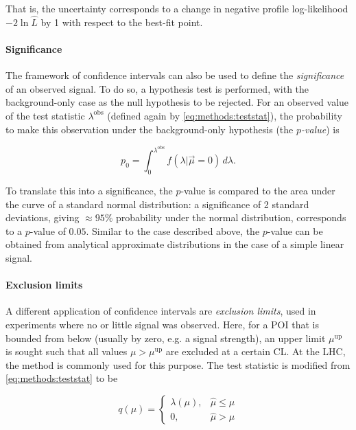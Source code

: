 That is, the uncertainty corresponds to a change in negative profile log-likelihood $-2 \ln \hat{L}$ by 1 with respect to the best-fit point.

\paragraph{Significance}

The framework of confidence intervals can also be used to define the \textit{significance} of an observed signal. To do so, a hypothesis test is performed, with the background-only case as the null hypothesis to be rejected. For an observed value of the test statistic $\lambda^{\mathrm{obs}}$ (defined again by \cref{eq:methods:teststat}), the probability to make this observation under the background-only hypothesis (the \textit{$p$-value}) is

\begin{equation}
\label{eq:methods:pvalue}
    p_0 = \int_0^{\lambda^{\mathrm{obs}}} f(\lambda | \vec{\mu} = 0) \, d\lambda.
\end{equation}

To translate this into a significance, the $p$-value is compared to the area under the curve of a standard normal distribution: a significance of 2 standard deviations, giving $\approx 95\%$ probability under the normal distribution, corresponds to a $p$-value of $0.05$. Similar to the case described above, the $p$-value can be obtained from analytical approximate distributions in the case of a simple linear signal.

\paragraph{Exclusion limits}

A different application of confidence intervals are \textit{exclusion limits}, used in experiments where no or little signal was observed. Here, for a POI that is bounded from below (usually by zero, e.g. a signal strength), an upper limit $\mu^{\mathrm{up}}$ is sought such that all values $\mu > \mu^{\mathrm{up}}$ are excluded at a certain CL. At the LHC, the \CLs method is commonly used for this purpose. The test statistic is modified from \cref{eq:methods:teststat} to be 

\begin{equation}
    q(\mu) = \begin{cases} 
        \lambda(\mu), & \hat{\mu} \leq \mu \\
        0, & \hat{\mu} > \mu
    \end{cases}
\end{equation}

